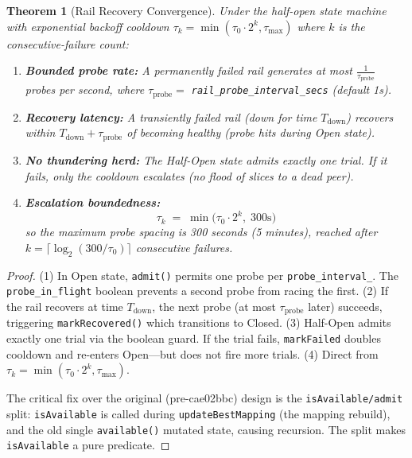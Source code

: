 \documentclass[11pt,a4paper,twoside]{article}
\theoremstyle{plain}
\newtheorem{theorem}{Theorem}[section]
\theoremstyle{definition}
\theoremstyle{remark}
\begin{document}
\begin{theorem}[Rail Recovery Convergence]
\label{thm:rail-recovery}
Under the half-open state machine with exponential backoff cooldown
$\tau_k = \min(\tau_0 \cdot 2^k, \tau_{\max})$ where $k$ is the consecutive-failure count:
\begin{enumerate}[nosep]
  \item \textbf{Bounded probe rate:} A permanently failed rail generates at most
    $\frac{1}{\tau_{\text{probe}}}$ probes per second, where
    $\tau_{\text{probe}} = $ \texttt{rail\_probe\_interval\_secs} (default 1s).
  \item \textbf{Recovery latency:} A transiently failed rail (down for time $T_{\text{down}}$)
    recovers within $T_{\text{down}} + \tau_{\text{probe}}$ of becoming healthy
    (probe hits during Open state).
  \item \textbf{No thundering herd:} The Half-Open state admits exactly one trial.
    If it fails, only the cooldown escalates (no flood of slices to a dead peer).
  \item \textbf{Escalation boundedness:}
    \begin{equation}
      \tau_k \;=\; \min\bigl(\tau_0 \cdot 2^k,\; 300\text{s}\bigr)
    \end{equation}
    so the maximum probe spacing is 300 seconds (5 minutes), reached after
    $k = \lceil \log_2(300/\tau_0) \rceil$ consecutive failures.
\end{enumerate}
\end{theorem}

\begin{proof}
(1) In Open state, \texttt{admit()} permits one probe per \texttt{probe\_interval\_}.
The \texttt{probe\_in\_flight} boolean prevents a second probe from racing the first.
(2) If the rail recovers at time $T_{\text{down}}$, the next probe (at most
$\tau_{\text{probe}}$ later) succeeds, triggering \texttt{markRecovered()} which
transitions to Closed.
(3) Half-Open admits exactly one trial via the boolean guard. If the trial fails,
\texttt{markFailed} doubles cooldown and re-enters Open---but does not fire more trials.
(4) Direct from $\tau_k = \min(\tau_0 \cdot 2^k, \tau_{\max})$.

The critical fix over the original (pre-cae02bbc) design is the
\texttt{isAvailable/admit} split: \texttt{isAvailable} is called during
\texttt{updateBestMapping} (the mapping rebuild), and the old single \texttt{available()}
mutated state, causing recursion. The split makes \texttt{isAvailable} a pure predicate.
\end{proof}
\end{document}
